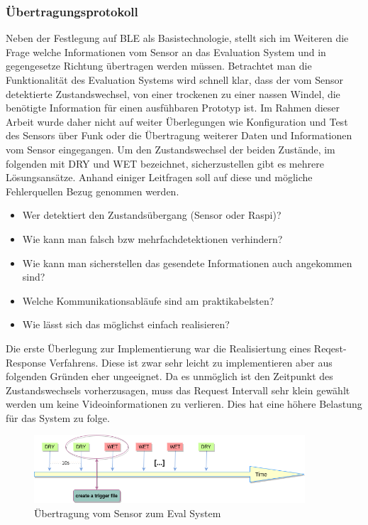 \subsubsection{Übertragungsprotokoll}
\label{subsubsec:unser_protokoll}

Neben der Festlegung auf BLE als Basistechnologie, stellt sich im Weiteren die Frage welche Informationen vom Sensor an das Evaluation System und in gegengesetze Richtung übertragen werden müssen. Betrachtet man die Funktionalität des Evaluation Systems wird schnell klar, dass der vom Sensor detektierte Zustandswechsel, von einer trockenen zu einer nassen Windel, die benötigte Information für einen ausfühbaren Prototyp ist. Im Rahmen dieser Arbeit wurde daher nicht auf weiter Überlegungen wie Konfiguration und Test des Sensors über Funk oder die Übertragung weiterer Daten und Informationen vom Sensor eingegangen. Um den Zustandswechsel der beiden Zustände, im folgenden mit DRY und WET bezeichnet, sicherzustellen gibt es mehrere Lösungsansätze. Anhand einiger Leitfragen soll auf diese und mögliche Fehlerquellen Bezug genommen werden.

\begin{itemize}
  \item Wer detektiert den Zustandsübergang (Sensor oder Raspi)?
  \item Wie kann man falsch bzw mehrfachdetektionen verhindern?
  \item Wie kann man sicherstellen das gesendete Informationen auch angekommen sind?
  \item Welche Kommunikationsabläufe sind am praktikabelsten?
  \item Wie lässt sich das möglichst einfach realisieren?
\end{itemize}

Die erste Überlegung zur Implementierung war die Realisiertung eines Reqest-Response Verfahrens. Diese ist zwar sehr leicht zu implementieren aber aus folgenden Gründen eher ungeeignet. 
Da es unmöglich ist den Zeitpunkt des Zustandswechsels vorherzusagen, muss das Request Intervall sehr klein gewählt werden um keine Videoinformationen zu verlieren. Dies hat eine höhere Belastung für das System zu folge. 

\begin{figure}[h]
  \centering
  \includegraphics[width=0.9\textwidth]{includes/kom/graphics/onNotification}
  \caption{Übertragung vom Sensor zum Eval System}
  \label{fig:ble_com_pr}
\end{figure}

